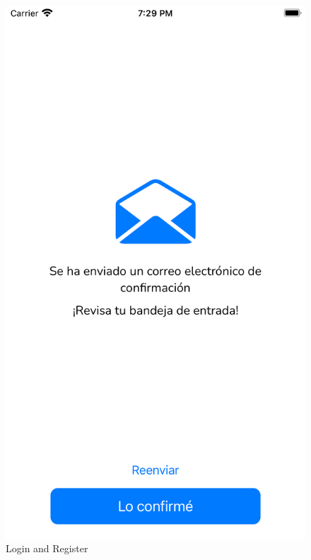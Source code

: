 \begin{appendices}
\begin{figure}[H]
\begin{minipage}{0.3\textwidth}
        \includegraphics[cframe=black 2pt, width=1\linewidth]{images/manual/registroConfirmacion.png}
    \end{minipage}
    \caption{Login and Register}
    \label{fig:login_register}
\end{figure}

\end{appendices}
